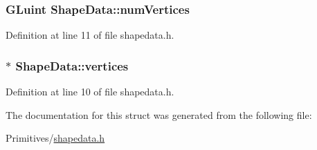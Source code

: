 \subsubsection[{num\+Vertices}]{\setlength{\rightskip}{0pt plus 5cm}G\+Luint Shape\+Data\+::num\+Vertices}\label{struct_shape_data_a255bf343d438b66c7a5a59f9c2a9be07}


Definition at line 11 of file shapedata.\+h.

\hypertarget{struct_shape_data_a4cb9087cff7d75dcba0cc6acf363468b}{}
\subsubsection[{vertices}]{$\ast$ Shape\+Data\+::vertices}\label{struct_shape_data_a4cb9087cff7d75dcba0cc6acf363468b}


Definition at line 10 of file shapedata.\+h.



The documentation for this struct was generated from the following file\+:\begin{DoxyCompactItemize}
\item 
Primitives/\hyperlink{shapedata_8h}{shapedata.\+h}\end{DoxyCompactItemize}
